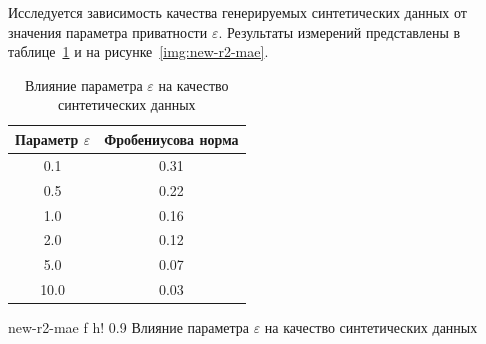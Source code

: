 






Исследуется зависимость качества генерируемых синтетических данных от значения параметра приватности $\varepsilon$. Результаты измерений представлены в таблице~\ref{tab:varepsilon_results} и на рисунке~\ref{img:new-r2-mae}.
\begin{table}[h!]
	\centering
	\captionsetup{justification=raggedleft}
	\caption{Влияние параметра $\varepsilon$ на качество синтетических данных}
	\label{tab:varepsilon_results}
	\begin{tabular}{|c|c|}
		\hline
		Параметр $\varepsilon$  & Фробениусова норма  \\
		\hline
		0.1 &  0.31 \\
		\hline
		0.5 & 0.22  \\
		\hline
		1.0 & 0.16  \\
		\hline
		2.0 & 0.12  \\
		\hline
		5.0  & 0.07 \\
		\hline
		10.0  & 0.03  \\
		\hline
	\end{tabular}
\end{table}
{new-r2-mae} %
{f} %
{h!} %
{0.9\textwidth} %
{Влияние параметра $\varepsilon$ на качество синтетических данных} %



